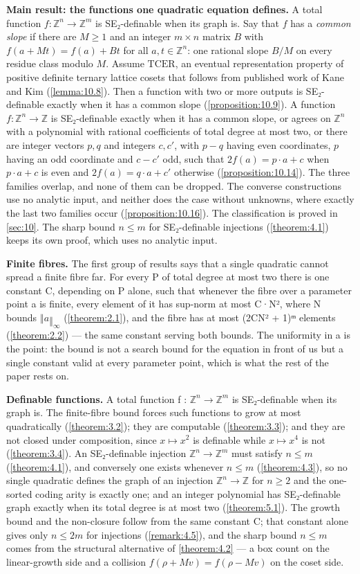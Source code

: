 \documentclass[11pt]{article}
\theoremstyle{plain}
\theoremstyle{definition}
\theoremstyle{remark}
\theoremstyle{plain}
\theoremstyle{definition}
\theoremstyle{remark}
\theoremstyle{plain}
\theoremstyle{definition}
\theoremstyle{remark}
\begin{document}
\textbf{Main result: the functions one quadratic equation defines.} A total function $f : ℤ^{n} → ℤ^{m}$ is SE₂-definable when its graph is. Say that $f$ has a \emph{common slope} if there are $M ≥ 1$ and an integer $m × n$ matrix $B$ with $f(a + Mt) = f(a) + Bt$ for all $a, t ∈ ℤ^{n}$: one rational slope $B/M$ on every residue class modulo $M$. Assume $\mathrm{TCER}$, an eventual representation property of positive definite ternary lattice cosets that follows from published work of Kane and Kim (\cref{lemma:10.8}). Then a function with two or more outputs is SE₂-definable exactly when it has a common slope (\cref{proposition:10.9}). A function $f : ℤ^{n} → ℤ$ is SE₂-definable exactly when it has a common slope, or agrees on $ℤ^{n}$ with a polynomial with rational coefficients of total degree at most two, or there are integer vectors $p, q$ and integers $c, c'$, with $p - q$ having even coordinates, $p$ having an odd coordinate and $c - c'$ odd, such that $2f(a) = p · a + c$ when $p · a + c$ is even and $2f(a) = q · a + c'$ otherwise (\cref{proposition:10.14}). The three families overlap, and none of them can be dropped. The converse constructions use no analytic input, and neither does the case without unknowns, where exactly the last two families occur (\cref{proposition:10.16}). The classification is proved in \cref{sec:10}. The sharp bound $n ≤ m$ for SE₂-definable injections (\cref{theorem:4.1}) keeps its own proof, which uses no analytic input.

\textbf{Finite fibres.} The first group of results says that a single quadratic cannot spread a finite fibre far. For every P of total degree at most two there is one constant C, depending on P alone, such that whenever the fibre over a parameter point a is finite, every element of it has sup-norm at most C·N², where N bounds $‖a‖_{∞}$ (\cref{theorem:2.1}), and the fibre has at most (2CN² + 1)ᵐ elements (\cref{theorem:2.2}) — the same constant serving both bounds. The uniformity in a is the point: the bound is not a search bound for the equation in front of us but a single constant valid at every parameter point, which is what the rest of the paper rests on.

\textbf{Definable functions.} A total function f : $ℤ^{n} → ℤ^{m}$ is SE₂-definable when its graph is. The finite-fibre bound forces such functions to grow at most quadratically (\cref{theorem:3.2}); they are computable (\cref{theorem:3.3}); and they are not closed under composition, since $x ↦ x^{2}$ is definable while $x ↦ x^{4}$ is not (\cref{theorem:3.4}). An SE₂-definable injection $ℤ^{n} → ℤ^{m}$ must satisfy $n ≤ m$ (\cref{theorem:4.1}), and conversely one exists whenever $n ≤ m$ (\cref{theorem:4.3}), so no single quadratic defines the graph of an injection $ℤ^{n} → ℤ$ for $n ≥ 2$ and the one-sorted coding arity is exactly one; and an integer polynomial has SE₂-definable graph exactly when its total degree is at most two (\cref{theorem:5.1}). The growth bound and the non-closure follow from the same constant C; that constant alone gives only $n ≤ 2m$ for injections (\cref{remark:4.5}), and the sharp bound $n ≤ m$ comes from the structural alternative of \cref{theorem:4.2} — a box count on the linear-growth side and a collision $f(ρ + Mv) = f(ρ − Mv)$ on the coset side.
\end{document}
